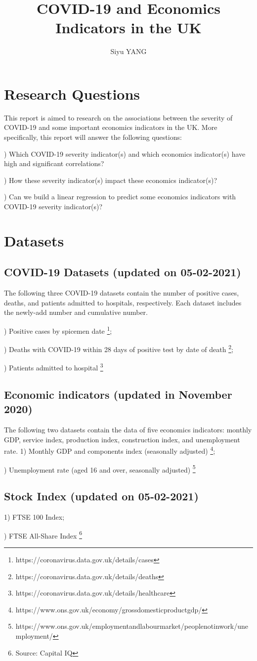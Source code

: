 \documentclass{report}
\title{COVID-19 and Economics Indicators in the UK}
\author{Siyu YANG}
\date{}
\begin{document}
\maketitle

\section{Research Questions}
This report is aimed to research on the associations between the severity of COVID-19 and some important 
economics indicators in the UK. More specifically, this report will answer the following questions:\par
{}) Which COVID-19 severity indicator(s) and which economics indicator(s) have high and significant correlations?\par
{}) How these severity indicator(s) impact these economics indicator(s)?\par
{}) Can we build a linear regression to predict some economics indicators with COVID-19 severity indicator(s)?

\section{Datasets}
\subsection{COVID-19 Datasets (updated on 05-02-2021)}
The following three COVID-19 datasets contain the number of positive cases, deaths, and patients admitted to hospitals, 
respectively. Each dataset includes the newly-add number and cumulative number.\par
{}) Positive cases by spicemen date
\footnote[1]{https://coronavirus.data.gov.uk/details/cases};\par
{}) Deaths with COVID-19 within 28 days of positive test by date of death
\footnote[2]{https://coronavirus.data.gov.uk/details/deaths};\par
{}) Patients admitted to hospital
\footnote[3]{https://coronavirus.data.gov.uk/details/healthcare}\par

\subsection{Economic indicators (updated in November 2020)} 
The following two datasets contain the data of five economics indicators: monthly GDP, service index, 
production index, construction index, and unemployment rate. 
1) Monthly GDP and components index (seasonally adjusted)
\footnote[4]{https://www.ons.gov.uk/economy/grossdomesticproductgdp/};\par
{}) Unemployment rate (aged 16 and over, seasonally adjusted)
\footnote[5]{https://www.ons.gov.uk/employmentandlabourmarket/peoplenotinwork/unemployment/}

\subsection{Stock Index (updated on 05-02-2021)}
1) FTSE 100 Index;\par
{}) FTSE All-Share Index
\footnote[6]{Source: Capital IQ}
\end{document}
